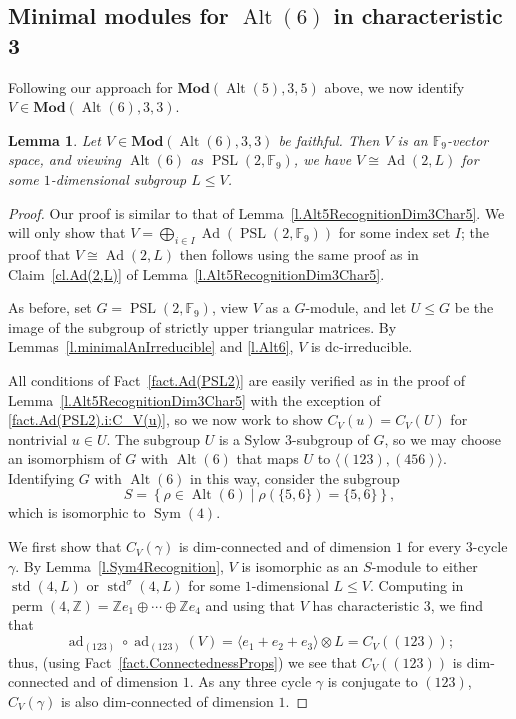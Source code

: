 \documentclass[a4paper, 11pt]{amsart}
\theoremstyle{plain}
\newtheorem{lemma}[theorem]{Lemma}
\theoremstyle{definition}
\theoremstyle{remark}
\DeclareMathOperator{\ad}{ad}
\DeclareMathOperator{\Sym}{Sym}
\DeclareMathOperator{\Alt}{Alt}
\DeclareMathOperator{\std}{std}
\DeclareMathOperator{\perm}{perm}
\DeclareMathOperator{\PSL}{PSL}
\DeclareMathOperator{\Ad}{Ad}
\newcommand{\Mod}{\mathbf{Mod}}
\newcommand{\bF}{\mathbb{F}}
\newcommand{\bZ}{\mathbb{Z}}
\begin{document}
\subsection{Minimal modules for \texorpdfstring{$\Alt(6)$}{Alt(6)} in characteristic 3}

Following our approach for $\Mod(\Alt(5),3,5)$ above, we now  identify $V\in \Mod(\Alt(6),3,3)$.

\begin{lemma}
    Let $V\in \Mod(\Alt(6),3,3)$ be faithful. Then $V$ is an $\bF_9$-vector space, and viewing $\Alt(6)$ as $\PSL(2,\bF_9)$, we have $V\cong \Ad(2, L)$ for some $1$-dimensional subgroup $L\le V$.
\end{lemma}
\begin{proof}
Our proof is similar to that of Lemma~\ref{l.Alt5RecognitionDim3Char5}. We will only show that  $V= \bigoplus_{i\in I}  \Ad(\PSL(2,\bF_9))$ for some index set $I$; the proof that $V\cong \Ad(2, L)$ then follows using the same proof as in Claim~\ref{cl.Ad(2,L)} of Lemma~\ref{l.Alt5RecognitionDim3Char5}.

As before, set $G =  \PSL(2,\bF_9)$, view $V$ as a $G$-module, and let $U\le G$ be the image of the subgroup of strictly upper triangular matrices. By Lemmas~\ref{l.minimalAnIrreducible} and \ref{l.Alt6}, $V$ is dc-irreducible.

All conditions of Fact~\ref{fact.Ad(PSL2)} are easily verified as in the proof of Lemma~\ref{l.Alt5RecognitionDim3Char5} with the exception of \eqref{fact.Ad(PSL2).i:C_V(u)},  
so we now work to show   $C_V(u) = C_V(U)$ for  nontrivial $u\in U$. The subgroup $U$ is a Sylow $3$-subgroup of $G$, so we may choose an isomorphism of $G$ with $\Alt(6)$ that maps $U$ to $\langle (123),(456)\rangle$. Identifying $G$ with $\Alt(6)$ in this way, consider the subgroup \[S=\left\{ \rho\in\Alt(6)\mid \rho\left(\{5,6\}\right) = \{5,6\}\right\},\] which is isomorphic to $\Sym(4)$.

We first show that $C_V(\gamma)$ is dim-connected and of dimension $1$ for every $3$-cycle $\gamma$. 
By Lemma~\ref{l.Sym4Recognition}, $V$ is isomorphic as an $S$-module to either $\std(4,L)$ or $\std^\sigma(4,L)$ for some $1$-dimensional $L\le V$. Computing in $\perm(4,\bZ) = \bZ{e_1} \oplus \cdots \oplus \bZ{e_4}$ and using that $V$ has characteristic $3$, we find that \[\ad_{(123)}\circ\ad_{(123)}(V) = \langle e_1 + e_2 + e_3\rangle \otimes L =  C_V((123));\] thus, (using Fact~\ref{fact.ConnectednessProps}) we see that $C_V((123))$ is dim-connected and of dimension $1$. As any three cycle $\gamma$ is conjugate to $(123)$, $C_V(\gamma)$ is also dim-connected of dimension $1$. 


\end{proof}
\end{document}
